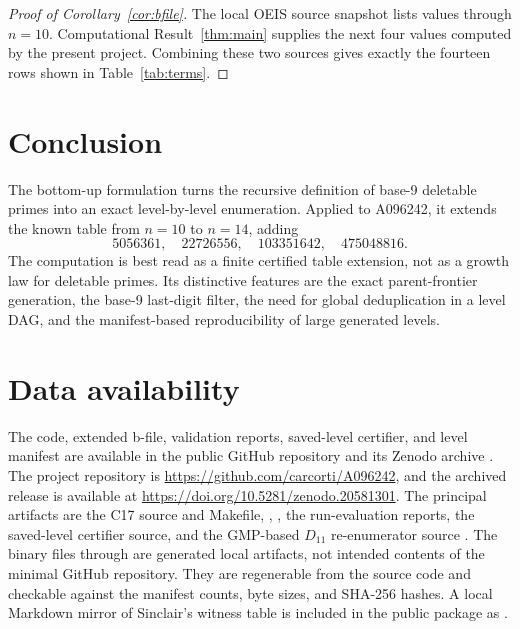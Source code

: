 \documentclass[11pt]{article}
\theoremstyle{definition}
\theoremstyle{remark}
\begin{document}
\begin{proof}[Proof of Corollary~\ref{cor:bfile}]
The local OEIS source snapshot lists values through \(n=10\).
Computational Result~\ref{thm:main} supplies the next four values computed
by the present project.  Combining these two sources gives exactly the
fourteen rows shown in Table~\ref{tab:terms}.
\end{proof}

\section{Conclusion}
\label{sec:conclusion}

The bottom-up formulation turns the recursive definition of base-9 deletable
primes into an exact level-by-level enumeration.  Applied to A096242, it
extends the known table from \(n=10\) to \(n=14\), adding
\[
  5056361,\quad 22726556,\quad 103351642,\quad 475048816.
\]
The computation is best read as a finite certified table extension, not as a
growth law for deletable primes.  Its distinctive features are the exact
parent-frontier generation, the base-9 last-digit filter, the need for
global deduplication in a level DAG, and the manifest-based reproducibility
of large generated levels.

\section*{Data availability}

The code, extended b-file, validation reports, saved-level certifier, and
level manifest are available in the public GitHub repository and its Zenodo
archive \cite{cortiA096242Package2026}.  The project repository is
\url{https://github.com/carcorti/A096242}, and the archived release is
available at \url{https://doi.org/10.5281/zenodo.20581301}.  The principal
artifacts are the C17 source and Makefile, ,
, the run-evaluation reports, the saved-level
certifier source, and the GMP-based \(D_{11}\) re-enumerator source
.  The binary files
 through  are generated local
artifacts, not intended contents of the minimal GitHub repository.  They are
regenerable from the source code and checkable against the manifest counts,
byte sizes, and SHA-256 hashes.  A local Markdown mirror of Sinclair's
witness table is included in the public package as
.
\end{document}
